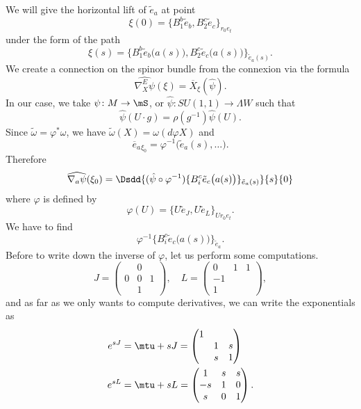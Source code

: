 We will give the horizontal lift of $\tilde{e}_a$ at point
\[
	\xi(0)=\{ B_1^b\tilde{e}_b,B_2^c\tilde{e}_c \}_{r_0e_t}
\]
under the form of the path
\[
	\xi(s)=\{ B_1^b\tilde{e}_b\big( a(s) \big),B_2^c\tilde{e}_c\big( a(s) \big) \}_{\tilde{e}_a(s)}.
\]
We create a connection on the spinor bundle from the connexion via the formula
\[
	\widehat{\nabla_X^E\psi}(\xi)=\overline{ X }_{\xi}(\hat \psi).
\]
In our case, we take $\psi\colon M\to \mS$, or $\hat{\psi}\colon SU(1,1)\to \Lambda W$ such that
\[
	\hat{\psi}(U\cdot g)=\rho(g^{-1})\hat{\psi}(U).
\]
Since $\tilde\omega=\varphi^*\omega$, we have $\tilde\omega(X)=\omega(d\varphi X)$ and
\[
	\overline{ e }_a{}_{\xi_0}=\varphi^{-1}\big( \tilde{e}_a(s),\ldots \big).
\]
Therefore
\begin{equation}  \label{eq_whidpsinabla}
	\widehat{\nabla_a\psi}(\xi_0)=\Dsdd{ (\hat{\psi}\circ\varphi^{-1})\{ B_i^c\tilde{e}_c\big( a(s) \big) \}_{\tilde{e}_a(s)} }{s}{0}
\end{equation}
where $\varphi$ is defined by
\[
	\varphi(U)=\{ U\tilde{e}_J,U\tilde{e}_L \}_{Ur_0e_t}.
\]
We have to find
\begin{equation}  \label{eq_varpBic}
	\varphi^{-1}\{ B_i^c\tilde{e}_c\big( a(s) \big) \}_{\tilde{e}_a}.
\end{equation}
Before to write down the inverse of $\varphi$, let us perform some computations.
\[
	J=\begin{pmatrix}
		  & 0     \\
		0 & 0 & 1 \\
		  & 1
	\end{pmatrix},\quad
	L=\begin{pmatrix}
		0 & 1 & 1 \\
		-1        \\
		1
	\end{pmatrix},
\]
and as far as we only wants to compute derivatives, we can write the exponentials as
\begin{align}
	e^{sJ} & =\mtu+sJ=\begin{pmatrix}
		                  1        \\
		                   & 1 & s \\
		                   & s & 1
	                  \end{pmatrix} \\
	e^{sL} & =\mtu+sL=\begin{pmatrix}
		                  1  & s & s \\
		                  -s & 1 & 0 \\
		                  s  & 0 & 1
	                  \end{pmatrix}.
\end{align}
